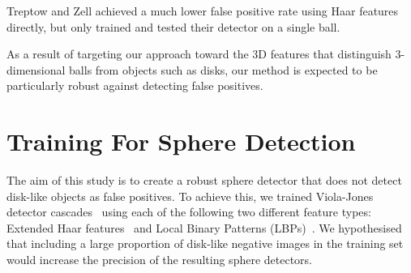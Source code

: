 \documentclass{sig-alternate-05-2015}
\newcommand{\tmpcomment}[1]{}
\newcommand{\citep}[1]{\cite{#1}}
\newcommand{\citet}[1]{\cite{#1}}
\begin{document}
{		Treptow and Zell \citet{treptow2004filter} achieved a much lower false positive rate using Haar features directly, but only trained and tested their detector on a single ball.

		As a result of targeting our approach toward the 3D features that distinguish 3-dimensional balls from objects such as disks, our method is expected to be particularly robust against detecting false positives.

	}

	\section{Training For Sphere Detection} {

		The aim of this study is to create a robust sphere detector that does not detect disk-like objects as false positives. To achieve this, we trained Viola-Jones detector cascades~\citep{viola2001rapid} using each of the following two different feature types: Extended Haar features~\citep{Lienhart2002extended}\tmpcomment{, Histograms of Oriented Gradients (HoG) features~\citep{dalal2005histograms},} and Local Binary Patterns (LBPs)~\citep{liao2007learning}. We hypothesised that including a large proportion of disk-like negative images in the training set would increase the precision of the resulting sphere detectors.



	}
\end{document}
